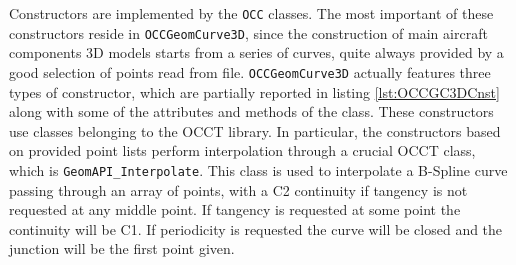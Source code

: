 \endgroup
%
\bigskip
\noindent
Constructors are implemented by the \lstinline[language=Java]!OCC! classes. The most important of these constructors reside in \lstinline[language=Java]!OCCGeomCurve3D!, since the construction of main aircraft components 3D models starts from a series of curves, quite always provided by a good selection of points read from file. \lstinline[language=Java]!OCCGeomCurve3D! actually features three types of constructor, which are partially reported in listing \ref{lst:OCCGC3DCnst} along with some of the attributes and methods of the class. These constructors use classes belonging to the \gls{OCCT} library. In particular, the constructors based on provided point lists perform interpolation through a crucial \gls{OCCT} class, which is \lstinline[language=Java]!GeomAPI_Interpolate!. This class is used to interpolate a B-Spline curve passing through an array of points, with a C2 continuity if tangency is not requested at any middle point. If tangency is requested at some point the continuity will be C1. If periodicity is requested the curve will be closed and the junction will be the first point given.
%
\bigskip
